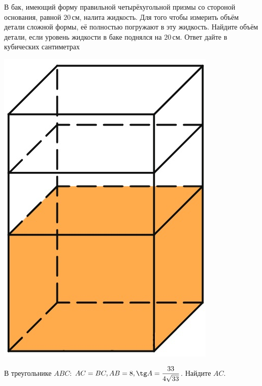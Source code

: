 \begin{class}[number=6]
\begin{listofex}
		\item
		\begin{minipage}[t]{0.70\linewidth}
			В бак, имеющий форму правильной четырёхугольной призмы со стороной основания, равной \(20\) см, налита жидкость. Для того чтобы измерить объём детали сложной формы, её полностью погружают в эту жидкость. Найдите объём детали, если уровень жидкости в баке поднялся на \(20\) см. Ответ дайте в кубических сантиметрах
		\end{minipage}
		\hspace{0.02\linewidth}
		\begin{minipage}[t]{0.16\linewidth}
			\includegraphics[align=t, width=\linewidth]{../pics/G101M8L6-6}
		\end{minipage}
		\item В треугольнике \(ABC\): \(AC=BC, AB=8, \tg A = \dfrac{ 33 }{ 4\sqrt{33} }\). Найдите \(AC\).

\end{listofex}
\end{class}
